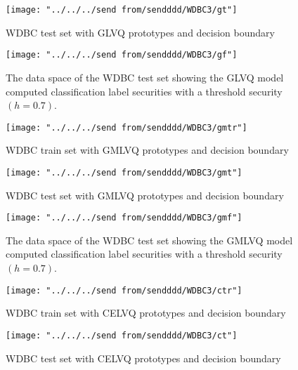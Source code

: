 \begin{figure}[H]
	\centering
	\texttt{[image: "../../../send from/sendddd/WDBC3/gt"]}
	\caption[WDBC test set with GLVQ prototypes]{WDBC test set with GLVQ prototypes and decision boundary}
	\label{fig:wg2}
\end{figure}


\begin{figure}[H]
	\centering
	\texttt{[image: "../../../send from/sendddd/WDBC3/gf"]}
	\caption[WDBC test set classification label security (GLVQ)]{The data space of the WDBC test set showing the GLVQ model computed classification label securities with a threshold security $(h=0.7)$.}
	\label{fig:wgd1}
\end{figure}

\begin{figure}[H]
	\centering
	\texttt{[image: "../../../send from/sendddd/WDBC3/gmtr"]}
	\caption[WDBC train set with GMLVQ prototypes]{WDBC train set with GMLVQ prototypes and decision boundary}
	\label{fig:wgm1}
\end{figure}

\begin{figure}[H]
	\centering
	\texttt{[image: "../../../send from/sendddd/WDBC3/gmt"]}
	\caption[WDBC test set with GMLVQ prototypes]{WDBC test set with GMLVQ prototypes and decision boundary}
	\label{fig:wgm2}
\end{figure}


\begin{figure}[H]
	\centering
	\texttt{[image: "../../../send from/sendddd/WDBC3/gmf"]}
	\caption[WDBC test set classification label security (GMLVQ)]{The data space of the WDBC test set showing the GMLVQ model computed classification label securities with a threshold security $(h=0.7)$.}
	\label{fig:wgmld}
\end{figure}


\begin{figure}[H]
	\centering
	\texttt{[image: "../../../send from/sendddd/WDBC3/ctr"]}
	\caption[WDBC train set with CELVQ prototypes]{WDBC train set with CELVQ prototypes and decision boundary}
	\label{fig:c1}
\end{figure}


\begin{figure}[H]
	\centering
	\texttt{[image: "../../../send from/sendddd/WDBC3/ct"]}
	\caption[WDBC test set with CELVQ prototypes]{WDBC test set with CELVQ prototypes and decision boundary}
	\label{fig:c2}
\end{figure}



